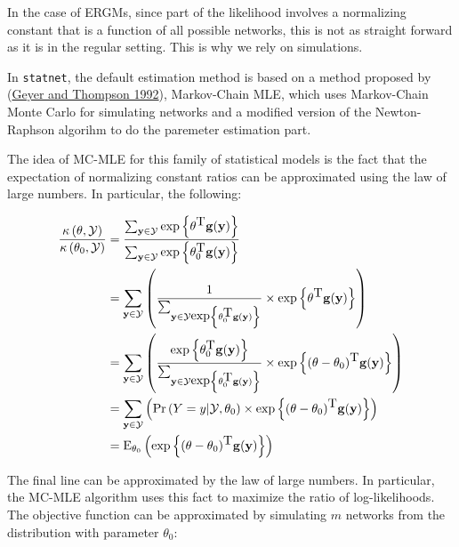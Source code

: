 \documentclass[
]{book}
\begin{document}
In the case of ERGMs, since part of the likelihood involves a normalizing constant that is a function of all possible networks, this is not as straight forward as it is in the regular setting. This is why we rely on simulations.

In \texttt{statnet}, the default estimation method is based on a method proposed by (\protect\hyperlink{ref-Geyer1992}{Geyer and Thompson 1992}), Markov-Chain MLE, which uses Markov-Chain Monte Carlo for simulating networks and a modified version of the Newton-Raphson algorihm to do the paremeter estimation part.

The idea of MC-MLE for this family of statistical models is the fact that the expectation of normalizing constant ratios can be approximated using the law of large numbers. In particular, the following:

\[
\begin{aligned}
\frac{\kappa\left(\theta,\mathcal{Y}\right)}{\kappa\left(\theta_0,\mathcal{Y}\right)} & = %
  \frac{%
    \sum_{\mathbf{y}\in\mathcal{Y}}\mbox{exp}\left\{\theta^{\mbox{T}}\mathbf{g}(\mathbf{y})\right\}}{ %
    \sum_{\mathbf{y}\in\mathcal{Y}}\mbox{exp}\left\{\theta_0^{\mbox{T}}\mathbf{g}(\mathbf{y})\right\}
  } \\
& = \sum_{\mathbf{y}\in\mathcal{Y}}\left( %
  \frac{1}{%
    \sum_{\mathbf{y}\in\mathcal{Y}\mbox{exp}\left\{\theta_0^{\mbox{T}}\mathbf{g}(\mathbf{y})\right\}}%
  } \times %
  \mbox{exp}\left\{\theta^{\mbox{T}}\mathbf{g}(\mathbf{y})\right\} %
  \right) \\
& = \sum_{\mathbf{y}\in\mathcal{Y}}\left( %
  \frac{\mbox{exp}\left\{\theta_0^{\mbox{T}}\mathbf{g}(\mathbf{y})\right\}}{%
    \sum_{\mathbf{y}\in\mathcal{Y}\mbox{exp}\left\{\theta_0^{\mbox{T}}\mathbf{g}(\mathbf{y})\right\}}%
  } \times %
  \mbox{exp}\left\{(\theta - \theta_0)^{\mbox{T}}\mathbf{g}(\mathbf{y})\right\} %
  \right) \\
& = \sum_{\mathbf{y}\in\mathcal{Y}}\left( %
  \mbox{Pr}\left(Y = y|\mathcal{Y}, \theta_0\right) \times %
  \mbox{exp}\left\{(\theta - \theta_0)^{\mbox{T}}\mathbf{g}(\mathbf{y})\right\} %
  \right) \\
& = \mbox{E}_{\theta_0}\left(\mbox{exp}\left\{(\theta - \theta_0)^{\mbox{T}}\mathbf{g}(\mathbf{y})\right\} \right)
\end{aligned}
\]

The final line can be approximated by the law of large numbers. In particular, the MC-MLE algorithm uses this fact to maximize the ratio of log-likelihoods. The objective function can be approximated by simulating \(m\) networks from the distribution with parameter \(\theta_0\):
\end{document}
